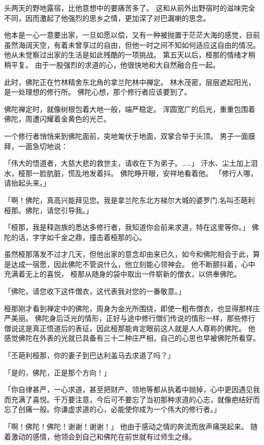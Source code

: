\documentclass[twoside,openany]{book}
\begin{document}
头两天的野地露宿，比他意想中的要痛苦多了。
这和从前外出野宿时的滋味完全不同，因而激起了他强烈的思乡之情，更加深了对巴漏喇的思念。

他本是一心一意要出家，一旦如愿以偿，又有一种被抛置于茫茫大海的感觉，目前虽然海阔天空，有着未曾享过的自由，但他一时之间不知如何适应这自由的情况。
他从未觉察过出家的生活是如此残酷的一项挑战。
第五天以后，桠那的情绪才稍稍平复。
由于一股强烈的求道的心，他很快地和大自然融合在一起。

此时，佛陀正在竹林精舍东北角的拿兰陀林中禅定。
林木茂密，层层遮起阳光，是一处理想的修行所。
佛陀心想，那个修行者应该要到了。

佛陀禅定时，就像树根包着大地一般，端严稳定。
浑圆宽广的后光，重重包围着佛陀，周遭闪耀着金黄色的光芒。

一个修行者悄悄来到佛陀面前，突地匍伏于地面，双掌合举于头顶。
男子一面膜拜，一面急切地说：

「伟大的悟道者，大慈大悲的救世主，请收在下为弟子。……」
汗水、尘土加上泪水，桠那一脸肮脏，慌乱地发着抖。
佛陀睁开眼，安祥地看着他。
「修行人哪，请抬起头来。」

「啊！佛陀，真高兴能拜见您。我是拿兰陀东北方梯尔大城的婆罗门,名叫丕葩利\textperiodcentered 桠那。佛陀，请您引导我。」

「桠那，我是释迦族的悉达多修行者，我知道你会前来求道，特在这里等你。」
佛陀的话，字字如千金之鼎，撞击着桠那的心。

虽然桠那落发不过才几天，但他出家的意念却由来已久，如今和佛陀相会于此，算是达成一宿愿，因此佛陀不管说什么，他立刻能心领神会。
他不断颤抖着，心中充满着无上的喜悦，
桠那从随身的袋中取出一件崭新的僧衣，以供奉佛陀。

「佛陀，请您收下这件僧衣，这代表我对您的一番敬意。」

桠那刚才看到禅定中的佛陀，周身为金光所围绕，即使一粗布僧衣，也显得那样庄严美丽。
佛陀身后泛光的情形，正好与途中修行僧们传说的情形一样，那些修行僧说这是真正悟道后的表征。因此桠那能肯定眼前这人就是人人尊称的佛陀。
他感觉佛陀在外表的光就已具备有三十二种庄严相，自己的心思也早被佛陀所看穿。

「丕葩利\textperiodcentered 桠那，你的妻子到巴达利\textperiodcentered 盖马去求道了吗？」

「是的，佛陀，正是那个方向！」

「你自律甚严，一心求道，甚至把财产、领地等都从执着中抛掉，心中更因遇见我而充满了喜悦。千万要注意，今后可不要忘了当初那种求道的心志，就像疤结好而忘了创痛一般。你谦虚求道的心，必能使你成为一个伟大的修行者。」

「啊！佛陀！佛陀！谢谢！谢谢！」
他由于感动之情的奔流而放声痛哭起来。
随着激动的感情，他领会到自己和佛陀在前世就有过师生之缘。
\end{document}
